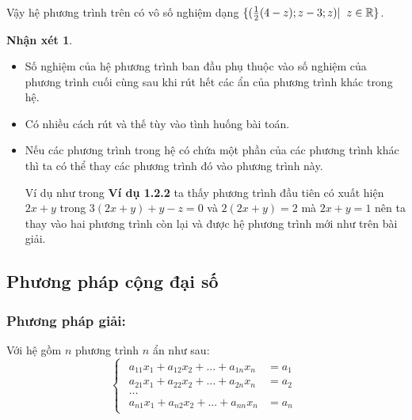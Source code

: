 \documentclass[12pt,a4paper,oneside]{book}
\theoremstyle{theorem}
\theoremstyle{definition}
\newtheorem{nx}[theorem2]{Nhận xét}
\begin{document}
Vậy hệ phương trình trên có vô số nghiệm dạng $\{(\frac{1}{2}(4-z);z-3;z)| \hspace{0.2cm} z \in \mathbb{R}\}$.
\begin{nx}

    \begin{itemize}
        \item Số nghiệm của hệ phương trình ban đầu phụ thuộc vào số nghiệm của phương trình cuối cùng sau khi rút hết các ẩn của phương trình khác trong hệ.
        \item Có nhiều cách rút và thế tùy vào tình huống bài toán.
        \item Nếu các phương trình trong hệ có chứa một phần của các phương trình khác thì ta có thể thay các phương trình đó vào phương trình này. 
        
        Ví dụ như trong \textbf{Ví dụ 1.2.2} ta thấy phương trình đầu tiên có xuất hiện \textit{$2x+y$} trong \textit{$3(2x+y)+y-z=0$} và \textit{$2(2x+y)=2$} mà \textit{$2x+y=1$} nên ta thay vào hai phương trình còn lại và được hệ phương trình mới như trên bài giải.
    \end{itemize}
\end{nx}
        \subsection{Phương pháp cộng đại số}
        \subsubsection{Phương pháp giải:}
         Với hệ gồm $ n$ phương trình $n$ ẩn như sau:
           \[ \begin{cases}
        
\begin{aligned}
a_{11}x_1+a_{12}x_2+...+a_{1n}x_n &=a_1 \\
a_{21}x_1+a_{22}x_2+...+a_{2n}x_n &=a_2 \\
\dots \\
a_{n1}x_1+a_{n2}x_2+...+a_{nn}x_n &=a_n
\end{aligned}
           \end{cases}
\]
\end{document}

